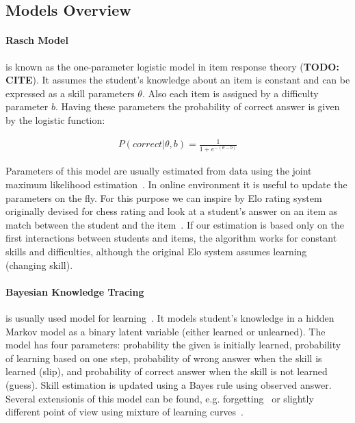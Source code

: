 \documentclass[table,color]{fithesis3/fithesis3}
\begin{document}
\subsection{Models Overview}

\paragraph*{Rasch Model} is known as the one-parameter logistic model in item
response theory (\textbf{TODO: CITE}). It assumes the student's knowledge about
an item is constant and can be expressed as a skill parameters $\theta$. Also
each item is assigned by a difficulty parameter $b$. Having these parameters
the probability of correct answer is given by the logistic function:

\begin{align}
P(correct|\theta,b) = \frac{1}{1 + e^{-(\theta - b)}}
\end{align}

Parameters of this model are usually estimated from data using the joint
maximum likelihood estimation~\cite{de2008theory}. In online environment it is
useful to update the parameters on the fly. For this purpose we can inspire by
Elo rating system~\cite{elo1978rating} originally devised for chess rating and
look at a student's answer on an item as match between the student and
the item~\cite{papousek2014adaptive}. If our estimation is based only on the
first interactions between students and items, the algorithm works for constant
skills and difficulties, although the original Elo system assumes learning (changing skill).

\paragraph*{Bayesian Knowledge Tracing} is usually used model for
learning~\cite{van2013properties}. It models student's knowledge in a hidden
Markov model as a binary latent variable (either learned or unlearned). The model
has four parameters: probability the given is initially learned, probability of
learning based on one step, probability of wrong answer when the skill is
learned (slip), and probability of correct answer when the skill is not learned
(guess). Skill estimation is updated using a Bayes rule using observed answer.
Several extensionis of this model can be found, e.g.
forgetting~\cite{qiu2010does} or slightly different point of view using mixture
of learning curves~\cite{streeter2015mixture}.
\end{document}
